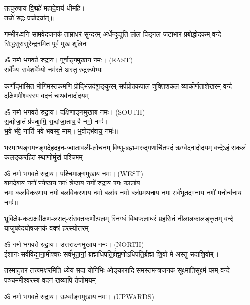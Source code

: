 {\small \closesection}

\begin{center}
तत्पुरु॑षाय वि॒द्महे॑ महादे॒वाय॑ धीमहि।\\
तन्नो॑ रुद्रः प्रचो॒दया᳚त्॥

{गम्भीरध्वनि-सामवेदजनकं ताम्राधरं सुन्दरम्}
{अर्धेन्दुद्युति-लोल-पिङ्गल-जटाभार-प्रबोद्धोदकम्}
{वन्दे सिद्धसुरासुरेन्द्रनमितं पूर्वं मुखं शूलिनः}

ॐ नमो भगवते॑ रुद्रा॒य। पूर्वाङ्गमुखाय नमः। {\scriptsize (EAST)}\\[1em]

{सर्वे᳚भ्यः सर्व॒शर्वे᳚भ्यो॒ नम॑स्ते अस्तु रु॒द्ररू॑पेभ्यः}

{कर्णोद्भासित-भोगिमस्तकमणि-प्रोद्भिन्नदंष्ट्राङ्कुरम्}
{सर्पप्रोतकपाल-शुक्तिशकल-व्याकीर्णताशेखरम्}
{वन्दे दक्षिणमीश्वरस्य वदनं चाथर्वनादोदयम्}

ॐ नमो भगवते॑ रुद्रा॒य। दक्षिणाङ्गमुखाय नमः। {\scriptsize (SOUTH)}\\[1em]

स॒द्योजा॒तं प्र॑पद्या॒मि॒ स॒द्योजा॒ताय॒ वै नमो॒ नमः॑।\\
भ॒वे भ॑वे॒ नाति॑ भवे भवस्व॒ माम्। भ॒वोद्भ॑वाय॒ नमः॑॥ 

{भस्माभ्यङ्गमनङ्गदेहदहन-ज्वालावली-लोचनम्}
{विष्णु-ब्रह्म-मरुद्गणार्चितपदं ऋग्वेदनादोदयम्}
{वन्देऽहं सकलं कलङ्करहितं स्थाणोर्मुखं पश्चिमम्}

ॐ नमो भगवते॑ रुद्रा॒य। पश्चिमाङ्गमुखाय नमः। {\scriptsize (WEST)}\\[1em]

वा॒म॒दे॒वाय॒ नमो᳚ ज्ये॒ष्ठाय॒ नमः॑ श्रे॒ष्ठाय॒ नमो॑ रु॒द्राय॒ नमः॒ काला॑य॒\\ नमः॒ कल॑विकरणाय॒ नमो॒ बल॑विकरणाय॒ नमो॒ बला॑य॒ नमो॒ बल॑प्रमथनाय॒ नमः॒ सर्व॑भूतदमनाय॒ नमो॑ म॒नोन्म॑नाय॒ नमः॑॥

{भ्रूविक्षेप-कटाक्षवीक्षण-लसत्-संसक्तकर्णोत्पलम्}
{स्निग्धं बिम्बफलाधरं प्रहसितं नीलालकालङ्कृतम्}
{वन्दे याजुषवेदघोषजनकं वक्त्रं हरस्योत्तरम्}

ॐ नमो भगवते॑ रुद्रा॒य। उत्तराङ्गमुखाय नमः। {\scriptsize (NORTH)}\\[1em]

ईशानः सर्व॑विद्या॒ना॒मीश्वरः सर्व॑भूता॒नां॒ ब्रह्माधि॑पति॒र्ब्रह्म॒णोऽधि॑पति॒र्ब्रह्मा॑ शि॒वो मे॑ अस्तु सदाशि॒वोम्॥

{तस्मादुत्तर-तत्त्वमक्षरमिति ध्येयं सदा योगिभिः}
{ओङ्कारादि समस्तमन्त्रजनकं सूक्ष्मातिसूक्ष्मं परम्}
{वन्दे पञ्चममीश्वरस्य वदनं खव्यापि तेजोमयम्}

ॐ नमो भगवते॑ रुद्रा॒य। ऊर्ध्वाङ्गमुखाय नमः। {\scriptsize (UPWARDS)}\\[1em]

\end{center}

